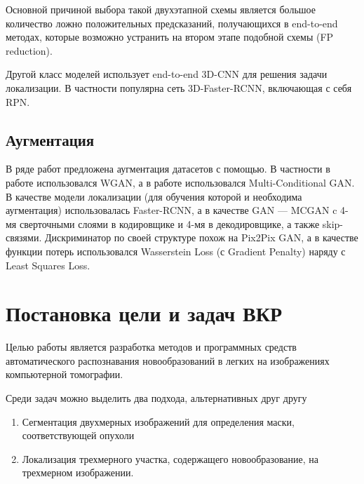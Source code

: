   

Основной причиной выбора такой двухэтапной схемы является большое количество ложно положительных предсказаний, получающихся в end-to-end методах, которые возможно устранить на втором этапе подобной схемы (FP reduction). 

  

Другой класс моделей использует end-to-end 3D-CNN для решения задачи локализации. В частности популярна сеть 3D-Faster-RCNN, включающая с себя RPN. 

  

\subsection{Аугментация} 

  

В ряде работ предложена аугментация датасетов с помощью. В частности в работе \cite{wgan-augmentation} использовался WGAN, а в работе \cite{han2019synthesizing} использовался Multi-Conditional GAN. В качестве модели локализации (для обучения которой и необходима аугментация) использовалась Faster-RCNN, а в качестве GAN --- MCGAN c 4-мя сверточными слоями в кодировщике и 4-мя в декодировщике, а также skip-связями. Дискриминатор по своей структуре похож на Pix2Pix GAN, а в качестве функции потерь использовался Wasserstein Loss (с Gradient Penalty) наряду с Least Squares Loss. 

  

\section{Постановка цели и задач ВКР} 

  

Целью работы является разработка методов и программных средств автоматического распознавания новообразований в легких на изображениях компьютерной томографии.  

  

Среди задач можно выделить два подхода, альтернативных друг другу 

  

\begin{enumerate} 

    \item Сегментация двухмерных изображений для определения маски, соответствующей опухоли 

    \item Локализация трехмерного участка, содержащего новообразование, на трехмерном изображении. 

\end{enumerate} 

